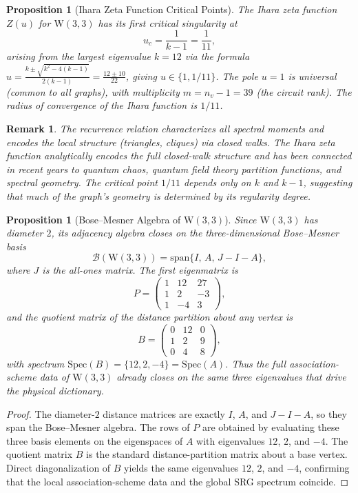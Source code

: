 \documentclass[12pt,a4paper]{article}
\newtheorem{proposition}[theorem]{Proposition}
\newtheorem{remark}[theorem]{Remark}
\newcommand{\W}{\mathrm{W}(3,3)}
\newcommand{\nv}{n_{\!v}}
\begin{document}
\begin{proposition}[Ihara Zeta Function Critical Points]
\label{prop:ihara}
The Ihara zeta function $Z(u)$ for $\W$ has its first critical singularity at
\[
  u_c = \frac{1}{k-1} = \frac{1}{11},
\]
arising from the largest eigenvalue $k=12$ via the formula
$u = \frac{k \pm \sqrt{k^2-4(k-1)}}{2(k-1)} = \frac{12 \pm 10}{22}$,
giving $u \in \{1, 1/11\}$. The pole $u=1$ is universal (common to all graphs),
with multiplicity $m=\nv-1=39$ (the circuit rank). The radius of convergence
of the Ihara function is $1/11$.
\end{proposition}

\begin{remark}
The recurrence relation characterizes all spectral moments and encodes
the local structure (triangles, cliques) via closed walks. The Ihara zeta function
analytically encodes the full closed-walk structure and has been connected
in recent years to quantum chaos, quantum field theory partition functions,
and spectral geometry. The critical point $1/11$ depends only on
$k$ and $k-1$, suggesting that much of the graph's geometry is determined
by its regularity degree.
\end{remark}

\begin{proposition}[Bose--Mesner Algebra of $\W$]\label{prop:bose-mesner}
Since $\W$ has diameter $2$, its adjacency algebra closes on the
three-dimensional Bose--Mesner basis
\[
  \mathcal{B}(\W) = \mathrm{span}\{I,\,A,\,J-I-A\},
\]
where $J$ is the all-ones matrix. The first eigenmatrix is
\[
  P =
  \begin{pmatrix}
    1 & 12 & 27 \\
    1 & 2  & -3 \\
    1 & -4 & 3
  \end{pmatrix},
\]
and the quotient matrix of the distance partition about any vertex is
\[
  B =
  \begin{pmatrix}
    0 & 12 & 0 \\
    1 & 2  & 9 \\
    0 & 4  & 8
  \end{pmatrix},
\]
with spectrum $\mathrm{Spec}(B)=\{12,2,-4\}=\mathrm{Spec}(A)$.
Thus the full association-scheme data of $\W$ already closes on the
same three eigenvalues that drive the physical dictionary.
\end{proposition}

\begin{proof}
The diameter-$2$ distance matrices are exactly $I$, $A$, and $J-I-A$,
so they span the Bose--Mesner algebra. The rows of $P$ are obtained by
evaluating these three basis elements on the eigenspaces of $A$ with
eigenvalues $12$, $2$, and $-4$. The quotient matrix $B$ is the standard
distance-partition matrix about a base vertex. Direct diagonalization of
$B$ yields the same eigenvalues $12$, $2$, and $-4$, confirming that the
local association-scheme data and the global SRG spectrum coincide.
\end{proof}
\end{document}
